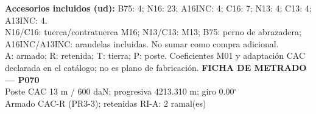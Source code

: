 \begingroup\scriptsize
\textbf{Accesorios incluidos (ud):} B75: 4; N16: 23; A16INC: 4; C16: 7; N13: 4; C13: 4; A13INC: 4.\\
N16/C16: tuerca/contratuerca M16; N13/C13: M13; B75: perno de abrazadera; A16INC/A13INC: arandelas incluidas. No sumar como compra adicional.\\
A: armado; R: retenida; T: tierra; P: poste. Coeficientes M01 y adaptación CAC declarada en el catálogo; no es plano de fabricación.
\endgroup\endgroup
\clearpage{}
\begingroup\small\setlength{\parskip}{3pt}\renewcommand{\arraystretch}{1.05}
\textbf{\large FICHA DE METRADO — P070}\\[4pt]
Poste CAC 13 m / 600 daN; progresiva 4213.310 m; giro 0.00\ensuremath{^\circ}\\
Armado CAC-R (PR3-3); retenidas RI-A: 2 ramal(es)\\
\begingroup\scriptsize
